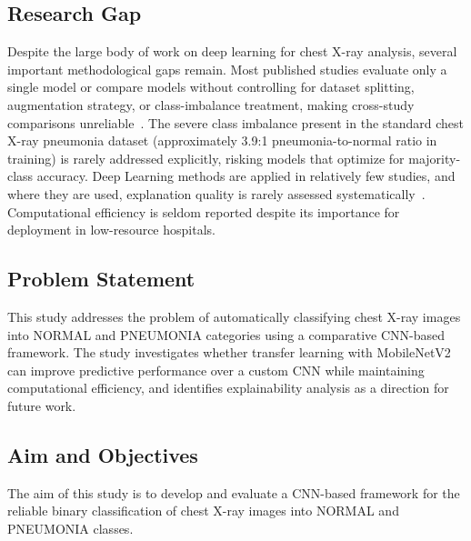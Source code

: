 \documentclass[preprint,12pt]{elsarticle}
\begin{document}
\subsection{Research Gap}
Despite the large body of work on deep learning for chest X-ray
analysis, several important methodological gaps remain.
Most published studies evaluate only a single model or compare models
without controlling for dataset splitting, augmentation strategy, or
class-imbalance treatment, making cross-study comparisons
unreliable~\cite{rajpurkar2017chexnet,hashmi2020}.
The severe class imbalance present in the standard chest X-ray
pneumonia dataset (approximately 3.9:1 pneumonia-to-normal ratio in
training) is rarely addressed explicitly, risking models that optimize
for majority-class accuracy.
Deep Learning methods are applied in relatively few studies, and where
they are used, explanation quality is rarely assessed
systematically~\cite{reshan2023}.
Computational efficiency is seldom reported despite its importance for
deployment in low-resource hospitals.

\subsection{Problem Statement}
This study addresses the problem of automatically classifying chest
X-ray images into NORMAL and PNEUMONIA categories using a comparative
CNN-based framework.
The study investigates whether transfer learning with MobileNetV2 can
improve predictive performance over a custom CNN while maintaining
computational efficiency, and identifies explainability analysis as a
direction for future work.

\subsection{Aim and Objectives}
The aim of this study is to develop and evaluate a CNN-based framework
for the reliable binary classification of chest X-ray images into
NORMAL and PNEUMONIA classes.
\end{document}
